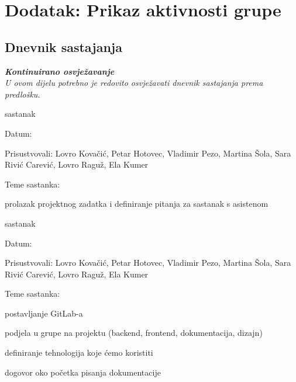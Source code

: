 \chapter*{Dodatak: Prikaz aktivnosti grupe}
		
		\section*{Dnevnik sastajanja}
		
		\textbf{\textit{Kontinuirano osvježavanje}}\\
		
		 \textit{U ovom dijelu potrebno je redovito osvježavati dnevnik sastajanja prema predlošku.}
		
		\begin{packed_enum}
			\item  sastanak
			
			\item[] \begin{packed_item}
				\item Datum: 
				\item Prisustvovali: Lovro Kovačić, Petar Hotovec, Vladimir Pezo, Martina Šola, Sara Rivić Carević, Lovro Raguž, Ela Kumer
				\item Teme sastanka:
				\begin{packed_item}
					\item  prolazak projektnog zadatka i definiranje pitanja za sastanak s asistenom
				\end{packed_item}
			\end{packed_item}
			
			\item  sastanak
			\item[] \begin{packed_item}
				\item Datum: \DTMdisplaydate{2022}{10}{27}{-1}
				\item Prisustvovali: Lovro Kovačić, Petar Hotovec, Vladimir Pezo, Martina Šola, Sara Rivić Carević, Lovro Raguž, Ela Kumer
				\item Teme sastanka:
				\begin{packed_item}
					\item  postavljanje GitLab-a
					\item  podjela u grupe na projektu (backend, frontend, dokumentacija, dizajn)
					\item  definiranje tehnologija koje ćemo koristiti
					\item  dogovor oko početka pisanja dokumentacije
				\end{packed_item}
			\end{packed_item}
			

\end{packed_enum}

